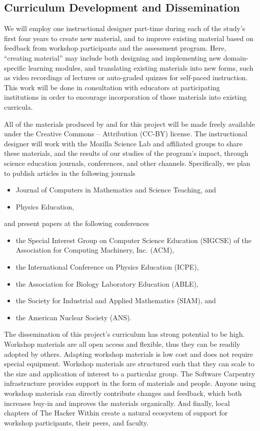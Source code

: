 \documentclass[11pt]{article}
\begin{document}
\subsection{Curriculum Development and Dissemination}

We will employ one instructional designer part-time during each of the
study's first four years to create new material, and to improve
existing material based on feedback from workshop participants and the
assessment program.  Here, ``creating material'' may include both
designing and implementing new domain-specific learning modules, and
translating existing materials into new forms, such as video
recordings of lectures or auto-graded quizzes for self-paced
instruction.  This work will be done in consultation with educators at
participating institutions in order to encourage incorporation of
those materials into existing curricula.

All of the materials produced by and for this project will be made
freely available under the Creative Commons -- Attribution (CC-BY)
license.  The instructional designer will work with the Mozilla
Science Lab and affiliated groups to share these materials, and the
results of our studies of the program's impact, through science
education journals, conferences, and other channels. Specifically, we plan to publish articles in the following journals 
\begin{itemize}
\item Journal of Computers in Mathematics and Science Teaching, and
%
\item Physics Education,
\end{itemize}
%
and present papers at the following conferences
\begin{itemize}
\item  the Special Interest Group on Computer Science Education (SIGCSE) of the Association for Computing Machinery, Inc. (ACM),
%
\item the International Conference on Physics Education (ICPE),
%
\item the Association for Biology Laboratory Education (ABLE),
%
\item the Society for Industrial and Applied Mathematics (SIAM), and
%
\item the American Nuclear Society (ANS).
\end{itemize}

The dissemination of this project's curriculum has strong potential to be high. Workshop materials are all open access and flexible, thus they can be readily adopted by others. Adapting workshop materials is low cost and does not require special equipment. Workshop materials are structured such that they can scale to the size and application of interest to a particular group. The Software Carpentry infrastructure provides support in the form of materials and people. Anyone using workshop materials can directly contribute changes and feedback, which both increases buy-in and improves the materials organically. And finally, local chapters of The Hacker Within create a natural ecosystem of support for workshop participants, their peers, and faculty. 
\end{document}
